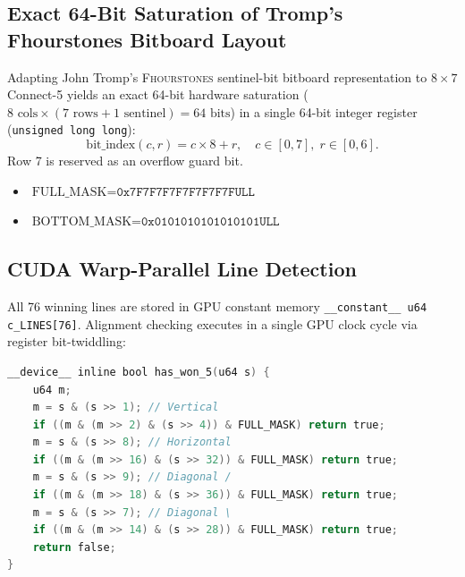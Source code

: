 \documentclass[11pt,reqno]{amsart}
\theoremstyle{plain}
\theoremstyle{definition}
\theoremstyle{remark}
\begin{document}
\subsection{Exact 64-Bit Saturation of Tromp's Fhourstones Bitboard Layout}
Adapting John Tromp's \textsc{Fhourstones} sentinel-bit bitboard representation \cite{tromp1995fhourstones} to $8 \times 7$ Connect-5 yields an exact 64-bit hardware saturation ($8 \text{ cols} \times (7 \text{ rows} + 1 \text{ sentinel}) = 64 \text{ bits}$) in a single 64-bit integer register (\texttt{unsigned long long}):
\begin{equation}
\text{bit\_index}(c, r) = c \times 8 + r, \quad c \in [0, 7],\; r \in [0, 6].
\end{equation}
Row 7 is reserved as an overflow guard bit.
\begin{itemize}
    \item $\text{FULL\_MASK} = \texttt{0x7F7F7F7F7F7F7F7FULL}$
    \item $\text{BOTTOM\_MASK} = \texttt{0x0101010101010101ULL}$
\end{itemize}

\subsection{CUDA Warp-Parallel Line Detection}
All 76 winning lines are stored in GPU constant memory \texttt{\_\_constant\_\_ u64 c\_LINES[76]}. Alignment checking executes in a single GPU clock cycle via register bit-twiddling:

\begin{lstlisting}[language=C]
__device__ inline bool has_won_5(u64 s) {
    u64 m;
    m = s & (s >> 1); // Vertical
    if ((m & (m >> 2) & (s >> 4)) & FULL_MASK) return true;
    m = s & (s >> 8); // Horizontal
    if ((m & (m >> 16) & (s >> 32)) & FULL_MASK) return true;
    m = s & (s >> 9); // Diagonal /
    if ((m & (m >> 18) & (s >> 36)) & FULL_MASK) return true;
    m = s & (s >> 7); // Diagonal \
    if ((m & (m >> 14) & (s >> 28)) & FULL_MASK) return true;
    return false;
}
\end{lstlisting}
\end{document}
